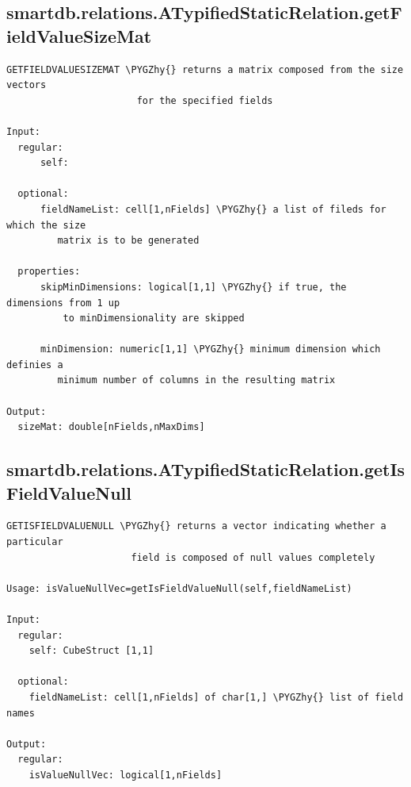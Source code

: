 \documentclass[letterpaper,10pt,english]{sphinxmanual}
\def\PYGZhy{\char`\-}
\begin{document}
\subsection{smartdb.relations.ATypifiedStaticRelation.getFieldValueSizeMat}
\label{chap_functions:smartdb-relations-atypifiedstaticrelation-getfieldvaluesizemat}
\begin{Verbatim}[commandchars=\\\{\}]
GETFIELDVALUESIZEMAT \PYGZhy{} returns a matrix composed from the size vectors
                       for the specified fields

Input:
  regular:
      self:

  optional:
      fieldNameList: cell[1,nFields] \PYGZhy{} a list of fileds for which the size
         matrix is to be generated

  properties:
      skipMinDimensions: logical[1,1] \PYGZhy{} if true, the dimensions from 1 up
          to minDimensionality are skipped

      minDimension: numeric[1,1] \PYGZhy{} minimum dimension which definies a
         minimum number of columns in the resulting matrix

Output:
  sizeMat: double[nFields,nMaxDims]
\end{Verbatim}


\subsection{smartdb.relations.ATypifiedStaticRelation.getIsFieldValueNull}
\label{chap_functions:smartdb-relations-atypifiedstaticrelation-getisfieldvaluenull}
\begin{Verbatim}[commandchars=\\\{\}]
GETISFIELDVALUENULL \PYGZhy{} returns a vector indicating whether a particular
                      field is composed of null values completely

Usage: isValueNullVec=getIsFieldValueNull(self,fieldNameList)

Input:
  regular:
    self: CubeStruct [1,1]

  optional:
    fieldNameList: cell[1,nFields] of char[1,] \PYGZhy{} list of field names

Output:
  regular:
    isValueNullVec: logical[1,nFields]
\end{Verbatim}
\end{document}

